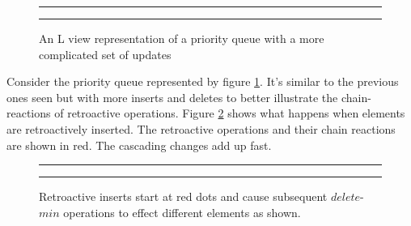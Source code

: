 \documentclass[11pt]{article}
\begin{document}
\begin{figure}[ht]
	\rule{\textwidth}{0.005in}
  \begin{center}
  \end{center}

  \caption{\small An L view representation of a priority queue with a more complicated set of updates}
  \label{fig-pqlview}
	\rule{\textwidth}{0.005in}
\end{figure}

Consider the priority queue represented by figure \ref{fig-pqlview}.  It's similar to the previous ones seen but with more inserts and deletes to better illustrate the chain-reactions of retroactive operations.  Figure \ref{fig-pqretro} shows what happens when elements are retroactively inserted.  The retroactive operations and their chain reactions are shown in red.  The cascading changes add up fast.

\begin{figure}[ht]
	\rule{\textwidth}{0.005in}
  \begin{center}
  \end{center}

  \caption{\small Retroactive inserts start at red dots and cause subsequent $delete$-$min$ operations to effect different elements as shown.}
  \label{fig-pqretro}
	\rule{\textwidth}{0.005in}
\end{figure}
\end{document}
